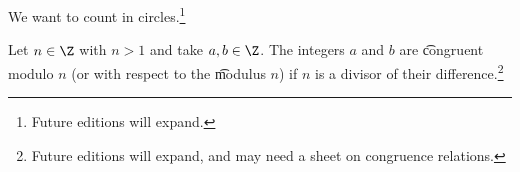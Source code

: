 

We want to count in circles.\footnote{Future editions will expand.}


Let $n \in \Z$ with $n > 1$ and take $a, b \in \Z$.
The integers $a$ and $b$ are \t{congruent modulo} $n$ (or with respect to the \t{modulus} $n$) if $n$ is a divisor of their difference.\footnote{Future editions will expand, and may need a sheet on congruence relations.}


\blankpage
